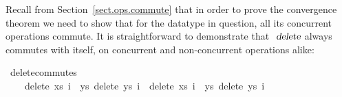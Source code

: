 Recall from Section~\ref{sect.ops.commute} that in order to prove the convergence theorem we need to show that for the datatype in question, all its concurrent operations commute.
It is straightforward to demonstrate that $\isa{delete}$ always commutes with itself, on concurrent and non-concurrent operations alike:
\begin{isabelle}
\ delete{\isacharunderscore}commutes{\isacharcolon}\\
~~~~{\isachardoublequoteopen}delete\ xs\ i{}\ {\isasymbind}\ {\isacharparenleft}{\isasymlambda}ys{\isachardot}\ delete\ ys\ i{}{\isacharparenright}\ {\isacharequal}\ delete\ xs\ i{}\ {\isasymbind}\ {\isacharparenleft}{\isasymlambda}ys{\isachardot}\ delete\ ys\ i{}{\isacharparenright}{\isachardoublequoteclose}
\end{isabelle}

